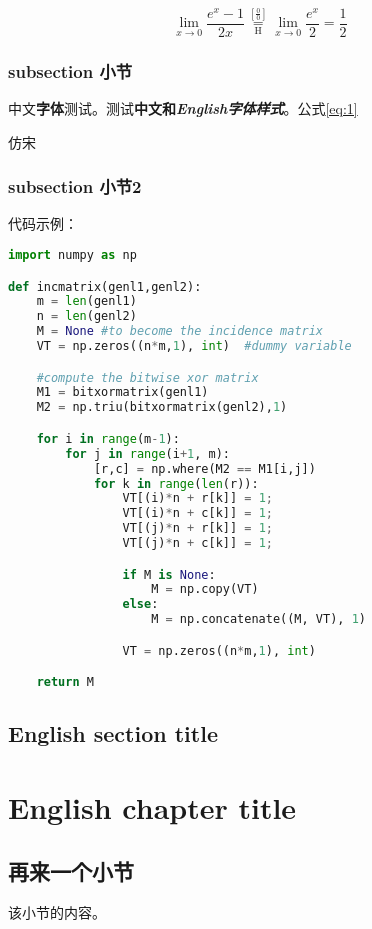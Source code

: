 \documentclass[a4paper,twoside]{ctexbook}
\begin{document}
\begin{equation}
  \label{eq:1}
   \lim_{x\to 0}{\frac{e^x-1}{2x}}
   \overset{\left[\frac{0}{0}\right]}{\underset{\mathrm{H}}{=}}
   \lim_{x\to 0}{\frac{e^x}{2}}={\frac{1}{2}}
\end{equation}

\subsection{subsection 小节}

中文\textbf{字体}测试。测试\textbf{中文和\textit{English字体样式}}。公式\ref{eq:1}

{\fzfs 仿宋}

\subsection{subsection 小节2}

代码示例：

\begin{lstlisting}[language=Python,caption={Python example}]
import numpy as np

def incmatrix(genl1,genl2):
    m = len(genl1)
    n = len(genl2)
    M = None #to become the incidence matrix
    VT = np.zeros((n*m,1), int)  #dummy variable

    #compute the bitwise xor matrix
    M1 = bitxormatrix(genl1)
    M2 = np.triu(bitxormatrix(genl2),1)

    for i in range(m-1):
        for j in range(i+1, m):
            [r,c] = np.where(M2 == M1[i,j])
            for k in range(len(r)):
                VT[(i)*n + r[k]] = 1;
                VT[(i)*n + c[k]] = 1;
                VT[(j)*n + r[k]] = 1;
                VT[(j)*n + c[k]] = 1;

                if M is None:
                    M = np.copy(VT)
                else:
                    M = np.concatenate((M, VT), 1)

                VT = np.zeros((n*m,1), int)

    return M
\end{lstlisting}


\section{English section title}

\lipsum[2-5]

\chapter{English chapter title}

\hspace{.15\linewidth}\begin{minipage}[H]{.7\linewidth}
{
  \hypersetup{hidelinks}
  \startcontents[chapters]
}
\end{minipage}
\vspace{10ex}

\lipsum[3]


\section{再来一个小节}

该小节的内容。
\end{document}
